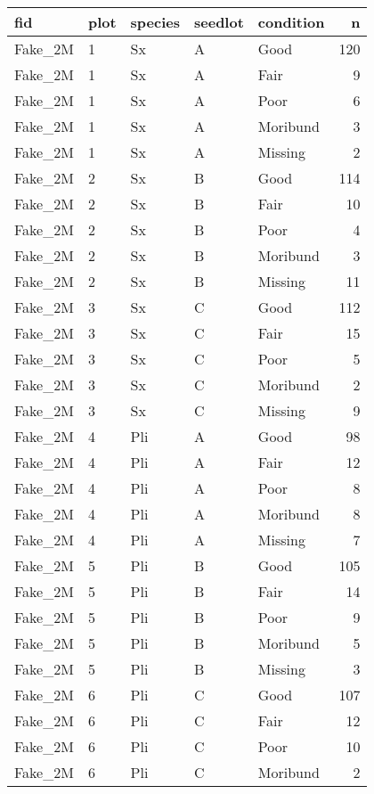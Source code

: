 \documentclass[
]{article}
\begin{document}
\begin{tabular}{l|l|l|l|l|r}
\hline
fid & plot & species & seedlot & condition & n\\
\hline
Fake\_2M & 1 & Sx & A & Good & 120\\
\hline
Fake\_2M & 1 & Sx & A & Fair & 9\\
\hline
Fake\_2M & 1 & Sx & A & Poor & 6\\
\hline
Fake\_2M & 1 & Sx & A & Moribund & 3\\
\hline
Fake\_2M & 1 & Sx & A & Missing & 2\\
\hline
Fake\_2M & 2 & Sx & B & Good & 114\\
\hline
Fake\_2M & 2 & Sx & B & Fair & 10\\
\hline
Fake\_2M & 2 & Sx & B & Poor & 4\\
\hline
Fake\_2M & 2 & Sx & B & Moribund & 3\\
\hline
Fake\_2M & 2 & Sx & B & Missing & 11\\
\hline
Fake\_2M & 3 & Sx & C & Good & 112\\
\hline
Fake\_2M & 3 & Sx & C & Fair & 15\\
\hline
Fake\_2M & 3 & Sx & C & Poor & 5\\
\hline
Fake\_2M & 3 & Sx & C & Moribund & 2\\
\hline
Fake\_2M & 3 & Sx & C & Missing & 9\\
\hline
Fake\_2M & 4 & Pli & A & Good & 98\\
\hline
Fake\_2M & 4 & Pli & A & Fair & 12\\
\hline
Fake\_2M & 4 & Pli & A & Poor & 8\\
\hline
Fake\_2M & 4 & Pli & A & Moribund & 8\\
\hline
Fake\_2M & 4 & Pli & A & Missing & 7\\
\hline
Fake\_2M & 5 & Pli & B & Good & 105\\
\hline
Fake\_2M & 5 & Pli & B & Fair & 14\\
\hline
Fake\_2M & 5 & Pli & B & Poor & 9\\
\hline
Fake\_2M & 5 & Pli & B & Moribund & 5\\
\hline
Fake\_2M & 5 & Pli & B & Missing & 3\\
\hline
Fake\_2M & 6 & Pli & C & Good & 107\\
\hline
Fake\_2M & 6 & Pli & C & Fair & 12\\
\hline
Fake\_2M & 6 & Pli & C & Poor & 10\\
\hline
Fake\_2M & 6 & Pli & C & Moribund & 2\\

\end{tabular}
\end{document}
